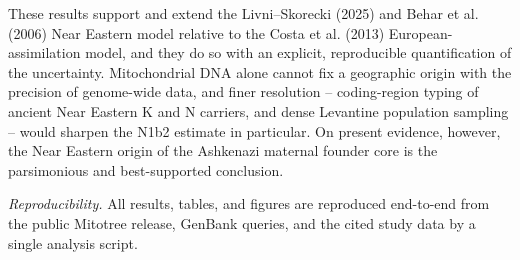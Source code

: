 \documentclass[11pt]{article}
\begin{document}
These results support and extend the Livni--Skorecki (2025) and Behar et al. (2006) Near Eastern model relative to the Costa et al. (2013) European-assimilation model, and they do so with an explicit, reproducible quantification of the uncertainty. Mitochondrial DNA alone cannot fix a geographic origin with the precision of genome-wide data, and finer resolution -- coding-region typing of ancient Near Eastern K and N carriers, and dense Levantine population sampling -- would sharpen the N1b2 estimate in particular. On present evidence, however, the Near Eastern origin of the Ashkenazi maternal founder core is the parsimonious and best-supported conclusion.

\vspace{0.5em}
\noindent\textit{Reproducibility.} All results, tables, and figures are reproduced end-to-end from the public Mitotree release, GenBank queries, and the cited study data by a single analysis script.
\end{document}
